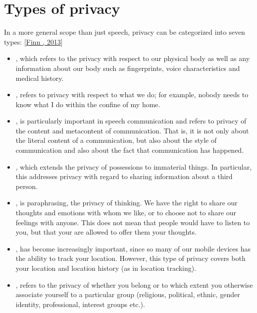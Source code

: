 \documentclass[letterpaper,10pt,english]{jupyterBook}
\begin{document}
\section{Types of privacy}
\label{\detokenize{Security_and_privacy:types-of-privacy}}
\sphinxAtStartPar
In a more general scope than just speech, privacy can be categorized
into seven types: {[}\hyperlink{cite.Security_and_privacy:id5}{Finn , 2013}{]}
\begin{itemize}
\item {} 
\sphinxAtStartPar
{}, which refers to the privacy with respect
to our physical body as well as any information about our body such
as fingerprints, voice characteristics and medical history.

\item {} 
\sphinxAtStartPar
{}, refers to privacy with respect
to what we do; for example, nobody needs to know what I do within
the confine of my home.

\item {} 
\sphinxAtStartPar
{}, is particularly important in speech
communication and refers to privacy of the content and meta\sphinxhyphen{}content
of communication. That is, it is not only about the literal content
of a communication, but also about the style of communication and
also about the fact that communication has happened.

\item {} 
\sphinxAtStartPar
{}, which extends the
privacy of possessions to immaterial things. In particular, this
addresses privacy with regard to sharing information about a third
person.

\item {} 
\sphinxAtStartPar
{} , is paraphrasing, the
privacy of thinking. We have the right to share our thoughts and
emotions with whom we like, or to choose not to share our feelings
with anyone. This does not mean that people would have to listen to
you, but that your are allowed to offer them your thoughts.

\item {} 
\sphinxAtStartPar
{}, has become increasingly
important, since so many of our mobile devices has the ability to
track your location. However, this type of privacy covers both your
location and location history (as in location tracking).

\item {} 
\sphinxAtStartPar
{}, refers to the privacy of whether you
belong or to which extent you otherwise associate yourself to a
particular group (religious, political, ethnic, gender identity,
professional, interest groups etc.).

\end{itemize}
\end{document}
